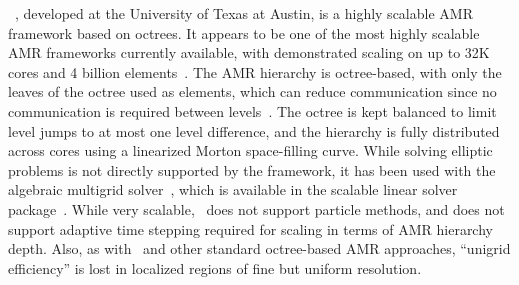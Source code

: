 \documentclass[11pt,letterpaper]{article}
\begin{document}
\SUBSUBSECTION{\alps}
%
\alps~\cite{BuBu09}, developed at the University of Texas at Austin,
is a highly scalable AMR framework based on octrees.  It appears to be
one of the most highly scalable AMR frameworks currently available,
with demonstrated scaling on up to 32K cores and 4 billion
elements~\cite{BuGh08}.
%
The AMR hierarchy is octree-based, with only the leaves of the octree
used as elements, which can reduce communication since no
communication is required between levels~\cite{BuGh08b}.  The octree
is kept balanced to limit level jumps to at most one level difference,
and the hierarchy is fully distributed across cores using a linearized
Morton space-filling curve.  While solving elliptic problems is not
directly supported by the framework, it has been used with the
 algebraic multigrid solver~\cite{HeYa02}, which is
available in the  scalable linear solver
package~\cite{FaJo06}.
%
%
While very scalable, \alps\ does not support particle methods, and
does not support adaptive time stepping required for scaling in terms
of AMR hierarchy depth.
Also, as with \paramesh\ and other standard octree-based AMR
approaches, ``unigrid efficiency'' is lost in localized regions of
fine but uniform resolution.

\end{document}
